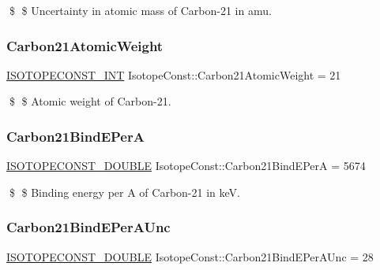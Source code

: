 \$ \$ Uncertainty in atomic mass of Carbon-\/21 in amu. \mbox{\label{group___isotope_const-_carbon-_c21_gac0f16ab5c05423b48a9c81c231a03a10}} 
\subsubsection{\texorpdfstring{Carbon21\+Atomic\+Weight}{Carbon21AtomicWeight}}
{\footnotesize\ttfamily \mbox{\hyperlink{group___isotope_const-_macros_ga5f18360b3e99483a35c32d789e62621c}{I\+S\+O\+T\+O\+P\+E\+C\+O\+N\+S\+T\+\_\+\+I\+NT}} Isotope\+Const\+::\+Carbon21\+Atomic\+Weight = 21}

\$ \$ Atomic weight of Carbon-\/21. \mbox{\label{group___isotope_const-_carbon-_c21_ga785bc7e27630cfaa9b7b7ec874fb3872}} 
\subsubsection{\texorpdfstring{Carbon21\+Bind\+E\+PerA}{Carbon21BindEPerA}}
{\footnotesize\ttfamily \mbox{\hyperlink{group___isotope_const-_macros_ga8f45a7272ce02c0b4c65c44636ed719a}{I\+S\+O\+T\+O\+P\+E\+C\+O\+N\+S\+T\+\_\+\+D\+O\+U\+B\+LE}} Isotope\+Const\+::\+Carbon21\+Bind\+E\+PerA = 5674}

\$ \$ Binding energy per A of Carbon-\/21 in keV. \mbox{\label{group___isotope_const-_carbon-_c21_ga87c90fed8aff619771f1d2e0581f74cd}} 
\subsubsection{\texorpdfstring{Carbon21\+Bind\+E\+Per\+A\+Unc}{Carbon21BindEPerAUnc}}
{\footnotesize\ttfamily \mbox{\hyperlink{group___isotope_const-_macros_ga8f45a7272ce02c0b4c65c44636ed719a}{I\+S\+O\+T\+O\+P\+E\+C\+O\+N\+S\+T\+\_\+\+D\+O\+U\+B\+LE}} Isotope\+Const\+::\+Carbon21\+Bind\+E\+Per\+A\+Unc = 28}


